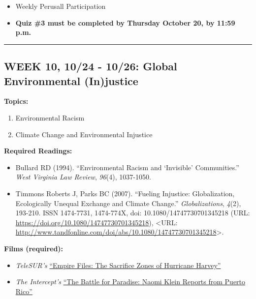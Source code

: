 \documentclass[11pt,]{article}
\providecommand{\tightlist}{%
  \setlength{\itemsep}{0pt}\setlength{\parskip}{0pt}}
\begin{document}
\begin{itemize}
\tightlist
\item
  Weekly Perusall Participation
\item
  \textbf{Quiz \#3 must be completed by Thursday October 20, by 11:59
  p.m.}
\end{itemize}

\bigbreak
\hrule

\hypertarget{week-10-1024---1026-global-environmental-injustice}{%
\subsection{WEEK 10, 10/24 - 10/26: Global Environmental
(In)justice}\label{week-10-1024---1026-global-environmental-injustice}}

\textbf{Topics:}

\begin{enumerate}
\def\labelenumi{(\arabic{enumi})}
\tightlist
\item
  Environmental Racism
\item
  Climate Change and Environmental Injustice
\end{enumerate}

\textbf{Required Readings:}

\begin{itemize}
\item
  Bullard RD (1994). ``Environmental Racism and `Invisible'
  Communities.'' \emph{West Virginia Law Review}, \emph{96}(4),
  1037-1050.
\item
  Timmons Roberts J, Parks BC (2007). ``Fueling Injustice:
  Globalization, Ecologically Unequal Exchange and Climate Change.''
  \emph{Globalizations}, \emph{4}(2), 193-210. ISSN 1474-7731,
  1474-774X, doi: 10.1080/14747730701345218 (URL:
  \url{https://doi.org/10.1080/14747730701345218}), \textless URL:
  \url{http://www.tandfonline.com/doi/abs/10.1080/14747730701345218}\textgreater.
\end{itemize}

\textbf{Films (required):}

\begin{itemize}
\item
  \emph{TeleSUR's}
  \href{https://www.youtube.com/watch?v=cb4PH7ak_iU}{``Empire Files: The
  Sacrifice Zones of Hurricane Harvey''}
\item
  \emph{The Intercept's}
  \href{https://www.youtube.com/watch?v=pTiZtYaB3Zo}{``The Battle for
  Paradise: Naomi Klein Reports from Puerto Rico''}
\end{itemize}
\end{document}
